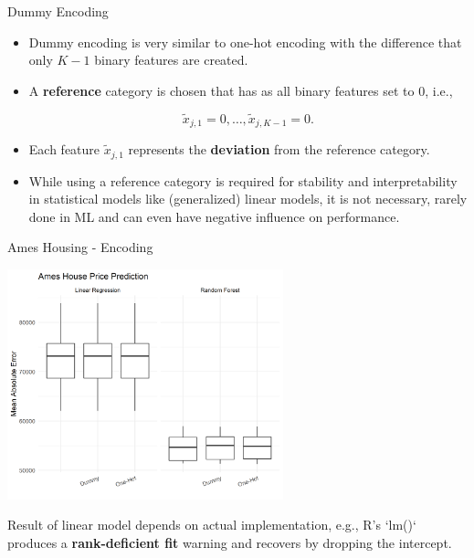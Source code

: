 \begin{vbframe}{Dummy Encoding}
  \begin{itemize}
    \item Dummy encoding is very similar to one-hot encoding with the difference that only $K-1$ binary features are created.
    \item A \textbf{reference} category is chosen that has as all binary features set to $0$, i.e.,
          
          $$
            \tilde x_{j,1} = 0, \dots, \tilde x_{j,K-1} = 0.
          $$
          
    \item Each feature $\tilde x_{j,1}$ represents the \textbf{deviation} from the reference category.
    \item While using a reference category is required for stability and interpretability in statistical models like (generalized) linear models, it is not necessary, rarely done in ML and can even have negative influence on performance.
  \end{itemize}
\end{vbframe}

\begin{vbframe}{Ames Housing - Encoding}
  
  \begin{center}
    \includegraphics[width = 0.6\textwidth]{figure_man/ames-encoding.png}
  \end{center}
  
  \begin{footnotesize}
    Result of linear model depends on actual implementation, e.g., R's `lm()` produces a \textbf{rank-deficient fit} warning and recovers by dropping the intercept.
  \end{footnotesize}
\end{vbframe}

